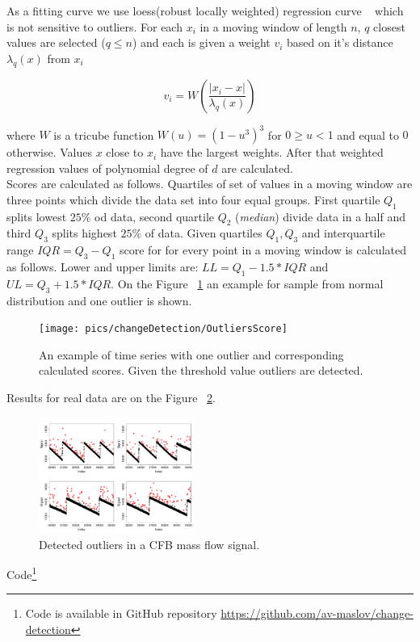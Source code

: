 As a fitting curve we use loess(robust locally weighted) regression
curve ~\cite{Loess} which is not sensitive to outliers.  For each
$x_{i}$ in a moving window of length $n$, $q$ closest values are
selected ($q \leq n$) and each is given a weight $v_{i}$ based on it's
distance $\lambda_{q}(x)$ from $x_{i}$

\begin{equation}
v_{i}=W(\frac{|x_{i}-x|}{\lambda_{q}(x)})
\end{equation}

where $W$ is a tricube function $W(u)=(1-u^{3})^{3}$ for $0 \geq u < 1$
and equal to $0$ otherwise. Values $x$ close to $x_{i}$ have the largest weights.
After that weighted regression values of polynomial degree of $d$ are calculated.\\

Scores are calculated as follows.
Quartiles of set of values in a moving window are three points which
divide the data set into four equal groups.  First quartile $Q_{1}$
splits lowest $25\%$ od data, second quartile $Q_{2}$
(\textit{median}) divide data in a half and third $Q_{3}$ splits
highest $25\%$ of data.  Given quartiles $Q_{1},Q_{3}$ and
interquartile range $IQR=Q_{3}-Q_{1}$ score for for every point in a
moving window is calculated as follows.
Lower and upper limits are: $LL = Q_{1}-1.5*IQR$ and $UL = Q_{3}+1.5*IQR$.
On the Figure ~\ref{fig:OutliersExample} an example for sample from
normal distribution and one outlier is shown.
\begin{figure}[htb!]
\center
\texttt{[image: pics/changeDetection/OutliersScore]}
\caption{An example of time series with one outlier and corresponding
  calculated scores. Given the threshold value outliers are detected.}
\label{fig:OutliersExample}
\end{figure}
Results for real data are on the Figure ~\ref{fig:OutliersCFB4}.
\begin{figure}[htb!]
    \center
    \includegraphics[width=0.45\textwidth]{pics/changeDetection/OutliersDatA4.pdf}
    \caption{Detected outliers in a CFB mass flow signal.}
    \label{fig:OutliersCFB4}
\end{figure}
Code\footnote{Code is available in GitHub repository \href{https://github.com/av-maslov/change-detection}{https://github.com/av-maslov/change-detection}}
